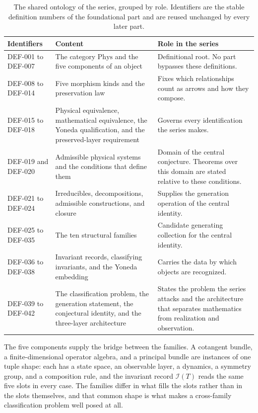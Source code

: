 \documentclass[11pt,letterpaper]{article}
\theoremstyle{definition}
\theoremstyle{remark}
\begin{document}
\begin{table}[t]
\centering
\small
\caption{The shared ontology of the series, grouped by role. Identifiers are the stable definition numbers of the foundational part and are reused unchanged by every later part.}
\label{tab:ontology}
\begin{tabularx}{\textwidth}{Y{0.55}Y{1.45}Y{1.0}}
\toprule
Identifiers & Content & Role in the series \\
\midrule
DEF-001 to DEF-007 & The category $\mathrm{Phys}$ and the five components of an object & Definitional root. No part bypasses these definitions. \\
DEF-008 to DEF-014 & Five morphism kinds and the preservation law & Fixes which relationships count as arrows and how they compose. \\
DEF-015 to DEF-018 & Physical equivalence, mathematical equivalence, the Yoneda qualification, and the preserved-layer requirement & Governs every identification the series makes. \\
DEF-019 and DEF-020 & Admissible physical systems and the conditions that define them & Domain of the central conjecture. Theorems over this domain are stated relative to these conditions. \\
DEF-021 to DEF-024 & Irreducibles, decompositions, admissible constructions, and closure & Supplies the generation operation of the central identity. \\
DEF-025 to DEF-035 & The ten structural families & Candidate generating collection for the central identity. \\
DEF-036 to DEF-038 & Invariant records, classifying invariants, and the Yoneda embedding & Carries the data by which objects are recognized. \\
DEF-039 to DEF-042 & The classification problem, the generation statement, the conjectural identity, and the three-layer architecture & States the problem the series attacks and the architecture that separates mathematics from realization and observation. \\
\bottomrule
\end{tabularx}
\end{table}

The five components supply the bridge between the families. A cotangent bundle, a finite-dimensional operator algebra, and a principal bundle are instances of one tuple shape: each has a state space, an observable layer, a dynamics, a symmetry group, and a composition rule, and the invariant record $\mathcal{I}(T)$ reads the same five slots in every case. The families differ in what fills the slots rather than in the slots themselves, and that common shape is what makes a cross-family classification problem well posed at all.
\end{document}
